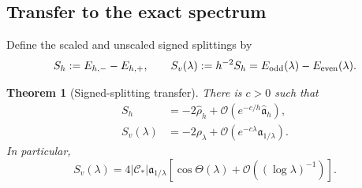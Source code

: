 \documentclass[11pt]{article}
\newtheorem{theorem}{Theorem}[section]
\newcommand{\cO}{\mathcal O}
\begin{document}
\subsection{Transfer to the exact spectrum}
Define the scaled and unscaled signed splittings by
\begin{equation}\label{eq:signed-splittings}
 S_h:=E_{h,-}-E_{h,+},
 \qquad
 S_v(\lambda):=h^{-2}S_h
 =E_{\rm odd}(\lambda)-E_{\rm even}(\lambda).
\end{equation}

\begin{theorem}[Signed-splitting transfer]
\label{thm:signed-transfer}
There is $c>0$ such that
\begin{align}
 S_h&=-2\widehat\rho_h
 +\cO\!\left(e^{-c/h}\widehat{\mathfrak a}_h\right),
 \label{eq:S-scaled-transfer}\\
 S_v(\lambda)&=-2\rho_\lambda
 +\cO\!\left(e^{-c\lambda}\mathfrak a_{1/\lambda}\right).
 \label{eq:S-unscaled-transfer}
\end{align}
In particular,
\begin{equation}\label{eq:S-cosine}
 S_v(\lambda)
 =4|\mathscr C_*|\mathfrak a_{1/\lambda}
 \left[\cos\Theta(\lambda)
 +\cO\!\left((\log\lambda)^{-1}\right)\right].
\end{equation}
\end{theorem}
\end{document}
